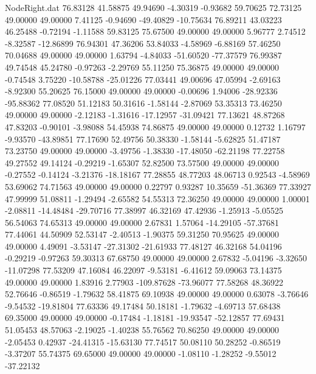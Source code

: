 \begin{filecontents}{NodeRight.dat}
  76.83128   41.58875   49.94690    -4.30319   -0.93682   59.70625   72.73125   49.00000   49.00000    7.41125   -0.94690  -49.40829  -10.75634
  76.89211   43.03223   46.25488    -0.72194   -1.11588   59.83125   75.67500   49.00000   49.00000    5.96777    2.74512   -8.32587  -12.86899
  76.94301   47.36206   53.84033    -4.58969   -6.88169   57.46250   70.04688   49.00000   49.00000    1.63794   -4.84033  -51.60520  -77.37579
  76.99387   49.74548   45.24780    -0.97263   -2.29769   55.11250   75.36875   49.00000   49.00000   -0.74548    3.75220  -10.58788  -25.01226
  77.03441   49.00696   47.05994    -2.69163   -8.92300   55.20625   76.15000   49.00000   49.00000   -0.00696    1.94006  -28.92336  -95.88362
  77.08520   51.12183   50.31616    -1.58144   -2.87069   53.35313   73.46250   49.00000   49.00000   -2.12183   -1.31616  -17.12957  -31.09421
  77.13621   48.87268   47.83203    -0.90101   -3.98088   54.45938   74.86875   49.00000   49.00000    0.12732    1.16797   -9.93570  -43.89851
  77.17690   52.49756   50.38330    -1.58144   -5.62825   51.47187   73.23750   49.00000   49.00000   -3.49756   -1.38330  -17.48050  -62.21198
  77.22758   49.27552   49.14124    -0.29219   -1.65307   52.82500   73.57500   49.00000   49.00000   -0.27552   -0.14124   -3.21376  -18.18167
  77.28855   48.77203   48.06713     0.92543   -4.58969   53.69062   74.71563   49.00000   49.00000    0.22797    0.93287   10.35659  -51.36369
  77.33927   47.99999   51.08811    -1.29494   -2.65582   54.55313   72.36250   49.00000   49.00000    1.00001   -2.08811  -14.48484  -29.70716
  77.38997   46.32169   47.42936    -1.25913   -5.05525   56.54063   74.65313   49.00000   49.00000    2.67831    1.57064  -14.29105  -57.37681
  77.44061   44.50909   52.53147    -2.40513   -1.90375   59.31250   70.95625   49.00000   49.00000    4.49091   -3.53147  -27.31302  -21.61933
  77.48127   46.32168   54.04196    -0.29219   -0.97263   59.30313   67.68750   49.00000   49.00000    2.67832   -5.04196   -3.32650  -11.07298
  77.53209   47.16084   46.22097    -9.53181   -6.41612   59.09063   73.14375   49.00000   49.00000    1.83916    2.77903 -109.87628  -73.96077
  77.58268   48.36922   52.76646    -0.86519   -1.79632   58.41875   69.10938   49.00000   49.00000    0.63078   -3.76646   -9.54532  -19.81804
  77.63336   49.17484   50.18181    -1.79632   -4.69713   57.68438   69.35000   49.00000   49.00000   -0.17484   -1.18181  -19.93547  -52.12857
  77.69431   51.05453   48.57063    -2.19025   -1.40238   55.76562   70.86250   49.00000   49.00000   -2.05453    0.42937  -24.41315  -15.63130
  77.74517   50.08110   50.28252    -0.86519   -3.37207   55.74375   69.65000   49.00000   49.00000   -1.08110   -1.28252   -9.55012  -37.22132

\end{filecontents}
